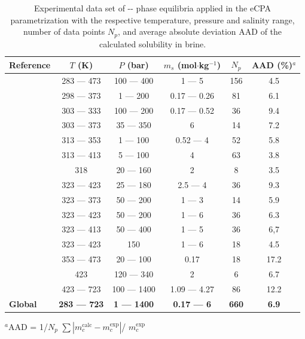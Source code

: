 \begin{table}[]
\caption{Experimental data set of -- phase equilibria applied in the eCPA parametrization with the respective temperature, pressure and salinity range, number of data points $N_p$, and average absolute deviation AAD of the calculated  solubility in brine.}
\centering
\begin{tabular}{lccccc}
\hline
\hline
 \textbf{Reference} & $T$ (K) & $P$ (bar)  & $m_s$ (mol$\cdot$kg$^{-1}$) &$N_p$  & AAD (\%)$^a$\\ 
 \hline
\citeauthor{Guo2016} \cite{Guo2016} & 283 — 473 & 100 — 400 & 1 — 5 & 156  & 4.5 \\
\citeauthor{Liu2021} \cite{Liu2021} & 298 — 373 & 1 — 200 & 0.17 — 0.26 & 81  & 6.1 \\
\citeauthor{Bando2003} \cite{Bando2003} & 303 — 333 & 100 — 200 & 0.17 — 0.52 & 36  & 9.4 \\
\citeauthor{Chabab2019} \cite{Chabab2019} & 303 — 373 & 35 — 350 & 6 & 14  & 7.2 \\
\citeauthor{Kiepe2002} \cite{Kiepe2002} & 313 — 353 & 1 — 100 & 0.52 — 4 & 52  & 5.8 \\
\citeauthor{Rumpf1994} \cite{Rumpf1994} & 313 — 413 & 5 — 100 & 4 & 63  & 3.8 \\
\citeauthor{Liu2011b} \cite{Liu2011b} & 318 & 20 — 160 & 2 & 8  & 3.5 \\
\citeauthor{Hou2013} \cite{Hou2013} & 323 — 423 & 25 — 180 & 2.5 — 4 & 36  & 9.3 \\
\citeauthor{Koschel2006} \cite{Koschel2006} & 323 — 373 & 50 — 200 & 1 — 3 & 14 & 5.9 \\
\citeauthor{Messabeb2016} \cite{Messabeb2016} & 323 — 423 & 50 — 200 & 1 — 6 & 36  & 6.3 \\
\citeauthor{Yan2011} \cite{Yan2011} & 323 — 413 & 50 — 400 & 1 — 5 & 36  & 6,7 \\
\citeauthor{Zhao2015} \cite{Zhao2015} & 323 — 423 & 150 & 1 — 6 & 18  & 4.5 \\
\citeauthor{Nighswander1989} \cite{Nighswander1989} & 353 — 473 & 20 — 100 & 0.17 & 18  & 17.2 \\
\citeauthor{Savary2012} \cite{Savary2012} & 423 & 120 — 340 & 2 & 6  & 6.7 \\
\citeauthor{Takenouchi1965} \cite{Takenouchi1965} & 423 — 723 & 100 — 1400 & 1.09 — 4.27 & 86  & 12.2 \\
\hline 
\textbf{Global} & \textbf{283 — 723} & \textbf{1 — 1400} & \textbf{0.17 — 6} & \textbf{660} & \textbf{6.9} \\ 
 \hline
 \hline
\end{tabular}
\flushleft
\footnotesize{$^a$AAD = 1/$N_p$ $\sum |m_c^{\text{calc}}-m_c^{\text{exp}}|$/ $m_c^{\text{exp}}$} 
\label{EXPs_CB}
\end{table}

